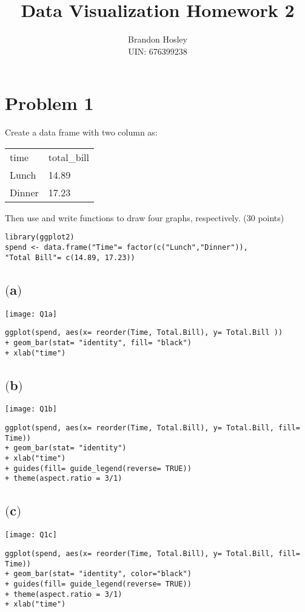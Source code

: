 \documentclass[a4paper,man,natbib]{apa6}
\title{Data Visualization Homework 2}
\author{Brandon Hosley \\ UIN: 676399238}
\date{}
\affiliation{Yanhui Guo, Ph.D}
\begin{document}
\maketitle
\singlespacing

\section{Problem 1}
Create a data frame with two column as:
\begin{center}
	\begin{tabular}{l l}
		time	& total\_bill \\
		Lunch	& 14.89	\\
		Dinner	& 17.23	\\
	\end{tabular}
\end{center}
Then use and write functions to draw four graphs, respectively. (30 points) \\
\begin{verbatim}
library(ggplot2)
spend <- data.frame("Time"= factor(c("Lunch","Dinner")),
"Total Bill"= c(14.89, 17.23))
\end{verbatim}

\subsection{$($a$)$}
\texttt{[image: Q1a]}
\begin{verbatim}
ggplot(spend, aes(x= reorder(Time, Total.Bill), y= Total.Bill )) 
+ geom_bar(stat= "identity", fill= "black") 
+ xlab("time")
\end{verbatim}

\subsection{$($b$)$}
\texttt{[image: Q1b]}
\begin{verbatim}
ggplot(spend, aes(x= reorder(Time, Total.Bill), y= Total.Bill, fill= Time)) 
+ geom_bar(stat= "identity") 
+ xlab("time") 
+ guides(fill= guide_legend(reverse= TRUE)) 
+ theme(aspect.ratio = 3/1)
\end{verbatim}

\subsection{$($c$)$}
\texttt{[image: Q1c]}
\begin{verbatim}
ggplot(spend, aes(x= reorder(Time, Total.Bill), y= Total.Bill, fill= Time)) 
+ geom_bar(stat= "identity", color="black") 
+ guides(fill= guide_legend(reverse= TRUE)) 
+ theme(aspect.ratio = 3/1)
+ xlab("time") 
\end{verbatim}
\end{document}
